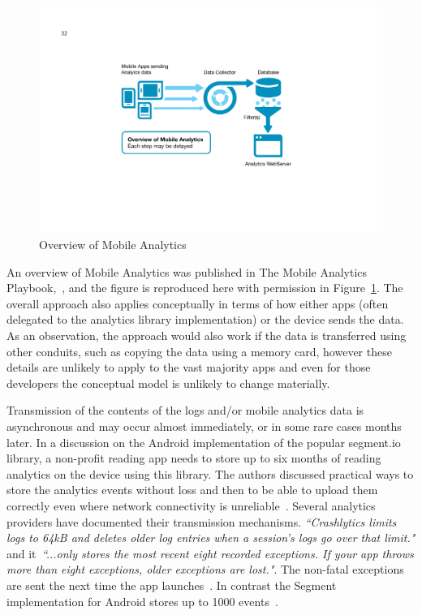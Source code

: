 \begin{figure}
    \includegraphics[width=\linewidth]{images/mobile-analytics-playbook/Chart-08-Overview-of-MobileAnalytics.pdf}
    \caption{Overview of Mobile Analytics~\cite{harty_aymer_playbook_2016}}
    \label{fig:map2016-overview-of-mobile-analytics}
\end{figure}

An overview of Mobile Analytics was published in The Mobile Analytics Playbook,~, and the figure is reproduced here with permission in Figure~\ref{fig:map2016-overview-of-mobile-analytics}. The overall approach also applies conceptually in terms of how either apps (often delegated to the analytics library implementation) or the device sends the data. As an observation, the approach would also work if the data is transferred using other conduits, such as copying the data using a memory card, however these details are unlikely to apply to the vast majority apps and even for those developers the conceptual model is unlikely to change materially.

Transmission of the contents of the logs and/or mobile analytics data is asynchronous and may occur almost immediately, or in some rare cases months later. In a discussion on the Android implementation of the popular segment.io library, a non-profit reading app needs to store up to six months of reading analytics on the device using this library. The authors discussed practical ways to store the analytics events without loss and then to be able to upload them correctly even where network connectivity is unreliable~. Several analytics providers have documented their transmission mechanisms. \emph{``Crashlytics limits logs to 64kB and deletes older log entries when a session's logs go over that limit."} and it~\emph{``...only stores the most recent eight recorded exceptions. If your app throws more than eight exceptions, older exceptions are lost."}.  The non-fatal exceptions are sent the next time the app launches~. In contrast the Segment implementation for Android stores up to 1000 events~.

